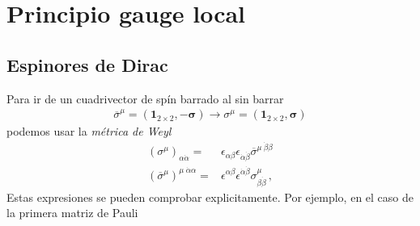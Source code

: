 \chapter{Principio gauge local}

\section{Espinores de Dirac}

Para ir de un cuadrivector de spín barrado al sin barrar
   \begin{align}
 \overline{\sigma}^{\mu}=\left( \mathbf{1}_{2\times2},-{\boldsymbol{\sigma}} \right) \rightarrow
\sigma^{\mu}= \left( \mathbf{1}_{2\times2},\boldsymbol{\sigma} \right)
\end{align}
podemos usar la \emph{métrica de Weyl}
\begin{align}
  \left( \sigma^{\mu} \right)_{\alpha\dot{\alpha}}=&\epsilon_{\alpha\beta}\epsilon_{\dot{\alpha}\dot{\beta}}\overline{\sigma}^{\mu\ \dot{\beta}\beta} \nonumber\\
  \left( \overline{\sigma}^{\mu} \right)^{\mu\;\dot{\alpha}\alpha}=&\epsilon^{\alpha\beta}\epsilon^{\dot{\alpha}\dot{\beta}}{\sigma}^{\mu}_{\beta\dot{\beta}} \,,
\end{align}
Estas expresiones se pueden comprobar explicitamente. Por ejemplo, en el caso de la primera matriz de Pauli
